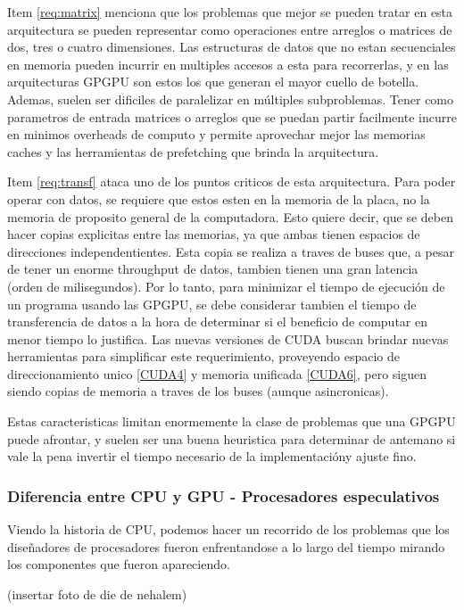 Item \ref{req:matrix} menciona que los problemas que mejor se pueden tratar en esta
arquitectura se pueden representar como operaciones entre arreglos o matrices de
dos, tres o cuatro dimensiones. Las estructuras de datos que no estan secuenciales
en memoria pueden incurrir en multiples accesos a esta para recorrerlas, y en las
arquitecturas GPGPU son estos los que generan el mayor cuello de botella. Ademas,
suelen ser dificiles de paralelizar en m\'ultiples subproblemas. Tener como parametros de
entrada matrices o arreglos que se puedan partir facilmente incurre en minimos
overheads de computo y permite aprovechar mejor las memorias caches y las herramientas de
prefetching que brinda la arquitectura.

Item \ref{req:transf} ataca uno de los puntos criticos de esta arquitectura. Para poder
operar con datos, se requiere que estos esten en la memoria de la placa, no la memoria
de proposito general de la computadora. Esto quiere decir, que se deben hacer copias
explicitas entre las memorias, ya que ambas tienen espacios de direcciones independentientes.
Esta copia se realiza a traves de buses que, a pesar de tener un enorme throughput de
datos, tambien tienen una gran latencia (orden de milisegundos). Por lo tanto, para minimizar
el tiempo de ejecuci\'on de un programa usando las GPGPU, se debe considerar tambien el
tiempo de transferencia de datos a la hora de determinar si el beneficio de computar en
menor tiempo lo justifica. Las nuevas versiones de CUDA buscan brindar nuevas herramientas
para simplificar este requerimiento, proveyendo espacio de direccionamiento unico \ref{CUDA4} y
memoria unificada \ref{CUDA6}, pero siguen siendo copias de memoria a traves de los
buses (aunque asincronicas).

Estas caracteristicas limitan enormemente la clase de problemas que una GPGPU puede
afrontar, y suelen ser una buena heuristica para determinar de antemano si vale la pena
invertir el tiempo necesario de la implementaci\'ony ajuste fino.


\subsubsection{Diferencia entre CPU y GPU - Procesadores especulativos}
Viendo la historia de CPU, podemos hacer un recorrido de los problemas que los dise\~nadores de procesadores
fueron enfrentandose a lo largo del tiempo mirando los componentes que fueron apareciendo.

(insertar foto de die de nehalem)

